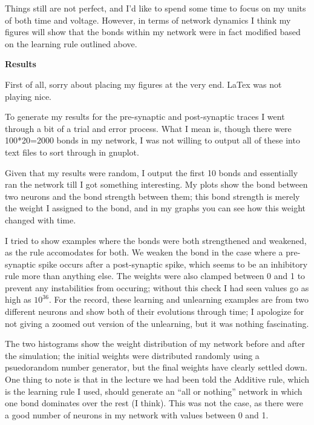 \documentclass[a4paper,12pt]{article}
\begin{document}
\vspace{2mm}

Things still are not perfect, and I'd like to spend some time to focus on my units of both time and voltage. However, in terms of network dynamics I think my figures will show that the bonds within my network were in fact modified based on the learning rule outlined above. 


\bigskip
{\bf Results}
\bigskip

First of all, sorry about placing my figures at the very end. LaTex was not playing nice. 

\vspace{2mm} 

To generate my results for the pre-synaptic and post-synaptic traces I went through a bit of a trial and error process. What I mean is, though there were 100*20=2000 bonds in my network, I was not willing to output all of these into text files to sort through in gnuplot. 

\vspace{2mm}

Given that my results were random, I output the first 10 bonds and essentially ran the network till I got something interesting. My plots show the bond between two neurons and the bond strength between them; this bond strength is merely the weight I assigned to the bond, and in my graphs you can see how this weight changed with time. 

\vspace{2mm}

I tried to show examples where the bonds were both strengthened and weakened, as the rule accomodates for both. We weaken the bond in the case where a pre-synaptic spike occurs after a post-synaptic spike, which seems to be an inhibitory rule more than anything else. The weights were also clamped between 0 and 1 to prevent any instabilities from occuring; without this check I had seen values go as high as $10^{36}$. For the record, these learning and unlearning examples are from two different neurons and show both of their evolutions through time; I apologize for not giving a zoomed out version of the unlearning, but it was nothing fascinating. 

\vspace{2mm}

The two histograms show the weight distribution of my network before and after the simulation; the initial weights were distributed randomly using a psuedorandom number generator, but the final weights have clearly settled down. One thing to note is that in the lecture we had been told the Additive rule, which is the learning rule I used, should generate an ``all or nothing'' network in which one bond dominates over the rest (I think). This was not the case, as there were a good number of neurons in my network with values between 0 and 1. 
\end{document}
